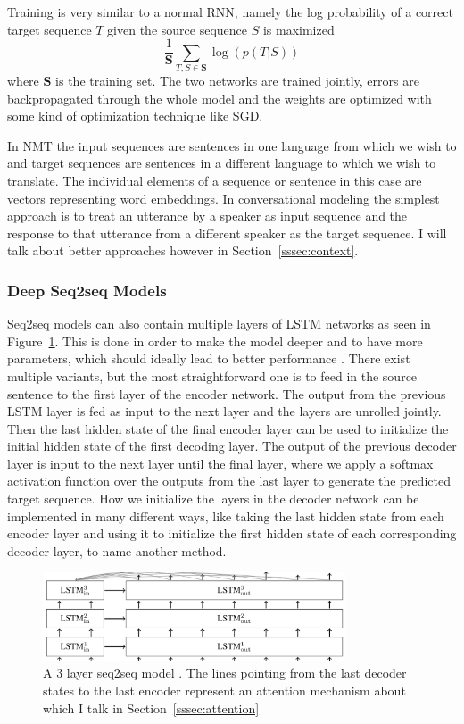\documentclass[12pt]{article}
\begin{document}
Training is very similar to a normal RNN, namely the log probability of a correct target sequence \(T\) given the source sequence \(S\) is maximized
\begin{equation} \label{eq232b}
\frac{1}{\bm{S}}\sum_{T,S \in \bm{S}}\log(p(T|S))
\end{equation}
where \(\bm{S}\) is the training set. The two networks are trained jointly, errors are backpropagated through the whole model and the weights are optimized with some kind of optimization technique like SGD.

In NMT the input sequences are sentences in one language from which we wish to and target sequences are sentences in a different language to which we wish to translate. The individual elements of a sequence or sentence in this case are vectors representing word embeddings. In conversational modeling the simplest approach is to treat an utterance by a speaker as input sequence and the response to that utterance from a different speaker as the target sequence. I will talk about better approaches however in Section~\ref{sssec:context}.
\subsubsection{Deep Seq2seq Models}
Seq2seq models can also contain multiple layers of LSTM networks as seen in Figure~\ref{fig:232b}. This is done in order to make the model deeper and to have more parameters, which should ideally lead to better performance \cite{Vinyals:2015,googleNMT:2016}. There exist multiple variants, but the most straightforward one is to feed in the source sentence to the first layer of the encoder network. The output from the previous LSTM layer is fed as input to the next layer and the layers are unrolled jointly. Then the last hidden state of the final encoder layer can be used to initialize the initial hidden state of the first decoding layer. The output of the previous decoder layer is input to the next layer until the final layer, where we apply a softmax activation function over the outputs from the last layer to generate the predicted target sequence. How we initialize the layers in the decoder network can be implemented in many different ways, like taking the last hidden state from each encoder layer and using it to initialize the first hidden state of each corresponding decoder layer, to name another method.

\begin{figure}[H]
	\centering
	\includegraphics[width=0.8\textwidth]{pics/deep_seq2seq.png}
	\caption{A 3 layer seq2seq model \cite{deep_seq2seq}. The lines pointing from the last decoder states to the last encoder represent an attention mechanism about which I talk in Section~\ref{sssec:attention}}
	\label{fig:232b}
\end{figure}
\end{document}
